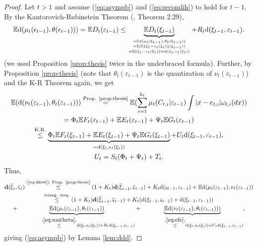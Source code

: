 \documentclass{article}              %
\begin{document}
\begin{proof}
Let $t>1$ and assume (\ref{eq:asympb}) and (\ref{eq:secondih})
to hold for $t-1$.
By the Kantorovich-Rubinstein Theorem (\cite{pflug2014multistage},
Theorem 2.29), 
\begin{equation}
\mathbb{E}\mathrm{d}(\mu_t(\epsilon_{t-1}),\theta(\epsilon_{t-1})))
=
\mathbb{E} D_{t}(\varepsilon_{t-1})
\leq
\underbrace{\mathbb{E} D_{t}(\xi_{t-1})}_
{{=\mathbb{E}\mathrm{d}(\mu_t(\xi_{t-1}),\theta_t(\xi_{t-1}))
\atop
=
\mathbb{E}(\mathbb{E}\|\xi_{t}-\epsilon_t(\xi_{t})\| |\xi_{t-1}))}
\atop
{=\mathbb{E}\|\xi_{t}-\epsilon_t(\xi_{t})\|=
\mathrm{d}(\xi_t,\epsilon_t(\xi_t))}}
+R_{t}\mathrm{d}(\xi_{t-1},\varepsilon_{t-1})
.\label{eq:mutheta}
\end{equation}
(we used  Proposition \ref{prop:thesis} twice in the underbraced formula). Further, by Proposition \ref{prop:thesis} (note that $\theta_{t}(\varepsilon_{t-1})$
is the quantization of $\nu_{t}(\varepsilon_{t-1})$) and the K-R
Theorem again, we get
\begin{multline}
\mathbb{E}(\mathrm{d}(\nu_{t}(\varepsilon_{t-1}),\theta_{t}(\varepsilon_{t-1})))
\stackrel{\text{Prop. \ref{prop:thesis}}}
=\mathbb{E}(\sum_{i=1}^{k_{t}}\mu_{t}(C_{t,i}|\varepsilon_{t-1})\int|x-e_{t,i}|\omega_{t,i}(dx))\\
=\Phi_{t}\mathbb{E} F_{t}(\varepsilon_{t-1})+\mathbb{E} E_{t}(\varepsilon_{t-1})+\Psi_{t}\mathbb{E} G_{t}(\varepsilon_{t-1})
\\
\stackrel{\text{K.R.}}\leq\underbrace{\Phi_{t}\mathbb{E} F_{t}(\xi_{t-1})+\mathbb{E} E_{t}(\xi_{t-1})+\Psi_{t}\mathbb{E} G_{t}(\xi_{t-1})}_{=\mathrm{d}(\xi_{t},\epsilon_{t}(\xi_{t}))}+U_{t}\mathrm{d}(\xi_{t-1},\varepsilon_{t-1}),\\
U_{t}=S_{t}(\Phi_{t}+\Psi_{t})+T_{t}.\label{eq:efe}
\end{multline}
Thus,
\begin{multline*}
\mathbf{d}(\overline{\xi}_{t},\overline{\varsigma}_{t})
\stackrel{\text{(\ref{eq:dfirst}), Prop. \ref{prop:thesis}}}
\leq
(1+K_{t})\mathbf{d}(\overline{\xi}_{t-1},\overline{\varsigma}_{t-1})+K_{t}\mathrm{d}(\varsigma_{t-1},\varepsilon_{t-1})+\mathbb{E}\mathrm{d}(\mu_{t}(\varepsilon_{t-1}),\nu_{t}(\varepsilon_{t-1}))\\
\stackrel{\text{triang. ineq.}}
\leq
(1+K_{t})\mathbf{d}(\overline{\xi}_{t-1},\overline{\varsigma}_{t-1})+K_{t}(\mathrm{d}(\xi_{t-1},\varsigma_{t-1})+\mathrm{d}(\xi_{t-1},\varepsilon_{t-1}))\\
+
\underbrace
{\mathbb{E}\mathrm{d}(\mu_{t}(\varepsilon_{t-1}),\theta_{t}(\varepsilon_{t-1}))}
_{\qquad\qquad \stackrel{(\ref{eq:mutheta})}\leq \mathrm{d}(\xi_t,\epsilon_t(\xi_t))+ R_{t}\mathrm{d}(\xi_{t-1},\varepsilon_{t-1})}
+
\underbrace
{\mathbb{E}\mathrm{d}(\nu_{t}(\varepsilon_{t-1}),\theta_{t}(\varepsilon_{t-1})))}
_
{\qquad\qquad\stackrel{(\ref{eq:efe})}\leq \mathrm{d}(\xi_t,\epsilon_t(\xi_t))+ U_{t}\mathrm{d}(\xi_{t-1},\varepsilon_{t-1})},
\end{multline*}
giving (\ref{eq:asympb}) by Lemma \ref{lem:ddd}. 


\end{proof}
\end{document}
